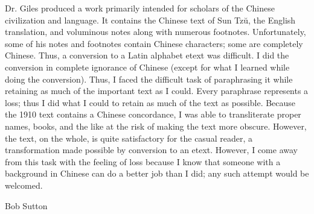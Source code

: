 \documentclass[10pt,a4paper]{book}
\begin{document}
Dr. Giles produced a work primarily intended for scholars of the Chinese civilization and language. It contains the Chinese text of Sun Tzŭ, the English translation, and voluminous notes along with numerous footnotes. Unfortunately, some of his notes and footnotes contain Chinese characters; some are completely Chinese. Thus, a conversion to a Latin alphabet etext was difficult. I did the conversion in complete ignorance of Chinese (except for what I learned while doing the conversion). Thus, I faced the difficult task of paraphrasing it while retaining as much of the important text as I could. Every paraphrase represents a loss; thus I did what I could to retain as much of the text as possible. Because the 1910 text contains a Chinese concordance, I was able to transliterate proper names, books, and the like at the risk of making the text more obscure. However, the text, on the whole, is quite satisfactory for the casual reader, a transformation made possible by conversion to an etext. However, I come away from this task with the feeling of loss because I know that someone with a background in Chinese can do a better job than I did; any such attempt would be welcomed. 

Bob Sutton 
\end{document}
